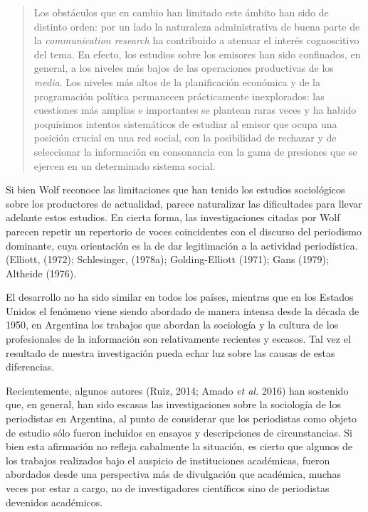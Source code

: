 \begin{quote}
Los obstáculos que en cambio han limitado este ámbito han sido de distinto orden: por un lado la naturaleza administrativa de buena parte de la \emph{communication research} ha contribuido a atenuar el interés cognoscitivo del tema. En efecto, los estudios sobre los emisores han sido confinados, en general, a los niveles más bajos de las operaciones productivas de los \emph{media}. Los niveles más altos de la planificación económica y de la programación política permanecen prácticamente inexplorados: las cuestiones más amplias e importantes se plantean raras veces y ha habido poquísimos intentos sistemáticos de estudiar al emisor que ocupa una posición crucial en una red social, con la posibilidad de rechazar y de seleccionar la información en consonancia con la gama de presiones que se ejercen en un determinado sistema social.
\end{quote}

Si bien Wolf reconoce las limitaciones que han tenido los estudios sociológicos sobre los productores de actualidad, parece naturalizar las dificultades para llevar adelante estos estudios. En cierta forma, las investigaciones citadas por Wolf parecen repetir un repertorio de voces coincidentes con el discurso del periodismo dominante, cuya orientación es la de dar legitimación a la actividad periodística. (Elliott, (1972); Schlesinger, (1978a); Golding-Elliott (1971); Gans (1979); Altheide (1976).

El desarrollo no ha sido similar en todos los países, mientras que en los Estados Unidos el fenómeno viene siendo abordado de manera intensa desde la década de 1950, en Argentina los trabajos que abordan la sociología y la cultura de los profesionales de la información son relativamente recientes y escasos. Tal vez el resultado de nuestra investigación pueda echar luz sobre las causas de estas diferencias.

Recientemente, algunos autores (Ruiz, 2014; Amado \emph{et al.} 2016) han sostenido que, en general, han sido escasas las investigaciones sobre la sociología de los periodistas en Argentina, al punto de considerar que los periodistas como objeto de estudio sólo fueron incluidos en ensayos y descripciones de circunstancias. Si bien esta afirmación no refleja cabalmente la situación, es cierto que algunos de los trabajos realizados bajo el auspicio de instituciones académicas, fueron abordados desde una perspectiva más de divulgación que académica, muchas veces por estar a cargo, no de investigadores científicos sino de periodistas devenidos académicos.


